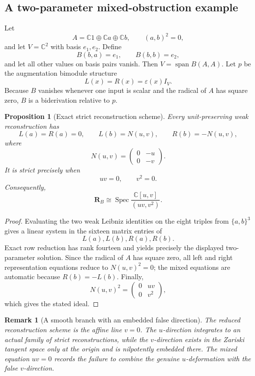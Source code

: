 \documentclass[11pt]{amsart}
\newtheorem{proposition}[theorem]{Proposition}
\newtheorem{remark}[theorem]{Remark}
\newcommand{\Span}{\operatorname{span}}
\newcommand{\Spec}{\operatorname{Spec}}
\newcommand{\C}{\mathbb C}
\begin{document}
\subsection{A two-parameter mixed-obstruction example}\label{sec:two-parameter-example}

Let
\[
A=\C1\oplus\C a\oplus\C b,
\qquad
(a,b)^2=0,
\]
and let $V=\C^2$ with basis $e_1,e_2$.  Define
\[
B(b,a)=e_1,
\qquad
B(b,b)=e_2,
\]
and let all other values on basis pairs vanish.  Then $V=\Span B(A,A)$.  Let $p$ be the augmentation bimodule structure
\[
L(x)=R(x)=\varepsilon(x)I_V.
\]
Because $B$ vanishes whenever one input is scalar and the radical of $A$ has square zero, $B$ is a biderivation relative to $p$.

\begin{proposition}[Exact strict reconstruction scheme]\label{prop:two-parameter-scheme}
Every unit-preserving weak reconstruction has
\[
L(a)=R(a)=0,
\qquad
L(b)=N(u,v),
\qquad
R(b)=-N(u,v),
\]
where
\[
N(u,v)=
\begin{pmatrix}
0&-u\\
0&-v
\end{pmatrix}.
\]
It is strict precisely when
\[
uv=0,
\qquad
v^2=0.
\]
Consequently,
\[
\boxed{
\mathbf R_B
\cong
\Spec\frac{\C[u,v]}{(uv,v^2)}.
}
\]
\end{proposition}

\begin{proof}
Evaluating the two weak Leibniz identities on the eight triples from $\{a,b\}^3$ gives a linear system in the sixteen matrix entries of
\[
L(a),L(b),R(a),R(b).
\]
Exact row reduction has rank fourteen and yields precisely the displayed two-parameter solution.  Since the radical of $A$ has square zero, all left and right representation equations reduce to $N(u,v)^2=0$; the mixed equations are automatic because $R(b)=-L(b)$.  Finally,
\[
N(u,v)^2
=
\begin{pmatrix}
0&uv\\
0&v^2
\end{pmatrix},
\]
which gives the stated ideal.
\end{proof}

\begin{remark}[A smooth branch with an embedded false direction]
The reduced reconstruction scheme is the affine line $v=0$.  The $u$-direction integrates to an actual family of strict reconstructions, while the $v$-direction exists in the Zariski tangent space only at the origin and is nilpotently embedded there.  The mixed equation $uv=0$ records the failure to combine the genuine $u$-deformation with the false $v$-direction.
\end{remark}
\end{document}
